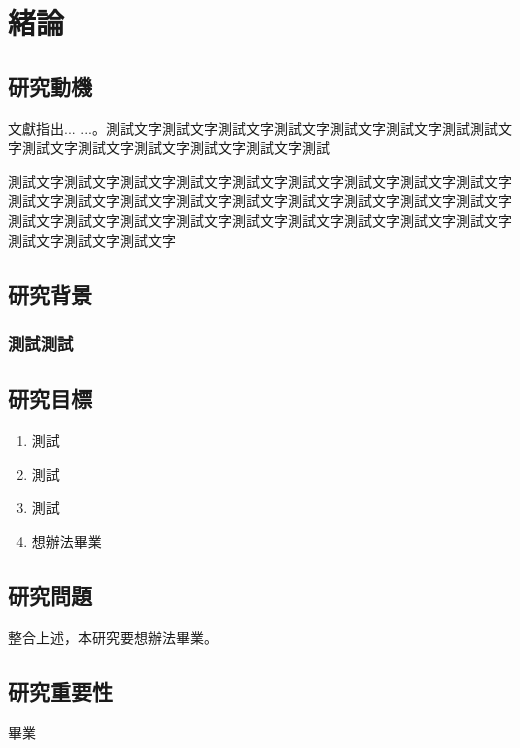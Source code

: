 \chapter{緒論}
\label{c:intro}

\section{研究動機}

文獻\cite{test2021}指出... ...。測試文字測試文字測試文字測試文字測試文字測試文字測試測試文字測試文字測試文字測試文字測試文字測試文字測試

測試文字測試文字測試文字測試文字測試文字測試文字測試文字測試文字測試文字測試文字測試文字測試文字測試文字測試文字測試文字測試文字測試文字測試文字測試文字測試文字測試文字測試文字測試文字測試文字測試文字測試文字測試文字測試文字測試文字測試文字

\section{研究背景}
\subsection{測試測試}

\section{研究目標}

\begin{enumerate}
\item 測試 
\item 測試 
\item 測試
\item 想辦法畢業
\end{enumerate}

\section{研究問題}
整合上述，本研究要想辦法畢業。

\section{研究重要性} 

畢業
